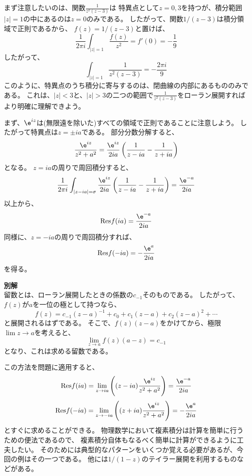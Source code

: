 まず注意したいのは、関数$\displaystyle \frac{1}{z^2(z-3)}$は
特異点として$z=0,3$を持つが、積分範囲$|z|=1$の中にあるのは$z=0$のみである。
したがって、関数$1/(z-3)$は積分領域で正則であるから、
$f(z) = 1/(z-3)$と置けば、
\begin{equation}
  \frac{1}{2\pi i} \int_{|z|=1} \frac{f(z)}{z^2} = f'(0) = - \frac{1}{9}
\end{equation}
したがって、
\begin{equation}
  \int_{|z|=1} \frac{1}{z^2(z-3)} =- \frac{2 \pi i}{9}
\end{equation}
このように、特異点のうち積分に寄与するのは、閉曲線の内部にあるもののみである。
これは、$|z|<3$と、$|z|>3$の二つの範囲で$\displaystyle \frac{1}{z^2(z-3)}$をローラン展開すればより明確に理解できよう。


まず、$\e^{iz}$は(無限遠を除いた)すべての領域で正則であることに注意しよう。
したがって特異点は$z = \pm i a$である。
部分分数分解すると、
\begin{equation}
  \frac{\e^{iz}}{z^2+a^2} = \frac{\e^{iz}}{2ia}
  \left(
  \frac{1}{z-ia} - \frac{1}{z+ia}
  \right)
\end{equation}
となる。
$z=ia$の周りで周回積分すると、
\begin{equation}
  \frac{1}{2\pi i} \int_{|z-ia|=\sigma} \frac{\e^{iz}}{2ia}
  \left(
  \frac{1}{z-ia} - \frac{1}{z+ia}
  \right)
  = \frac{\e^{-a}}{2ia}
\end{equation}
以上から、
\begin{equation}
  \mbox{Res} f(ia) = \frac{\e^{-a}}{2ia}
\end{equation}
同様に、$z=-ia$の周りで周回積分すれば、
\begin{equation}
  \mbox{Res} f(-ia) = - \frac{\e^{a}}{2ia}
\end{equation}
を得る。

{\bf 別解}\\
留数とは、ローラン展開したときの係数の$c_{-1}$そのものである。
したがって、$f(z)$が$a$を一位の極として持つなら、
\begin{equation}
  f(z) = c_{-1} (z-a)^{-1} + c_0 + c_1 (z-a) + c_2 (z-a)^2 + \cdots
\end{equation}
と展開されるはずである。
そこで、$f(z)(z-a)$をかけてから、極限$\lim z \rightarrow a$を考えると、
\begin{equation}
  \lim_{z \rightarrow a} f(z)(a-z) = c_{-1}
\end{equation}
となり、これは求める留数である。

この方法を問題に適用すると、
\begin{equation}
  \mbox{Res} f(ia) = \lim_{z \rightarrow ia} \left( (z-ia) \frac{\e^{iz}}{z^2+a^2} \right)
  = \frac{\e^{-a}}{2ia}
\end{equation}
\begin{equation}
  \mbox{Res} f(-ia) = \lim_{z \rightarrow -ia} \left( (z+ia) \frac{\e^{iz}}{z^2+a^2} \right)
  = -\frac{\e^{a}}{2ia}
\end{equation}
とすぐに求めることができる。
物理数学において複素積分は計算を簡単に行うための便法であるので、
複素積分自体もなるべく簡単に計算ができるように工夫したい。
そのためには典型的なパターンをいくつか覚える必要があるが、今回の例はその一つである。
他には$1/(1-z)$のテイラー展開を利用するものなどがある。

